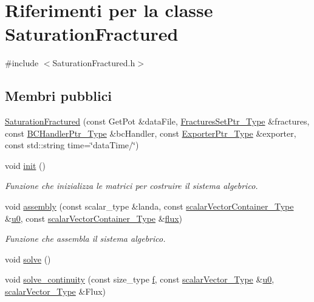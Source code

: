 \hypertarget{classSaturationFractured}{\section{Riferimenti per la classe Saturation\-Fractured}
\label{classSaturationFractured}
}


{\ttfamily \#include $<$Saturation\-Fractured.\-h$>$}

\subsection*{Membri pubblici}
\begin{DoxyCompactItemize}
\item 
\hyperlink{classSaturationFractured_a2d080ad53569f8a8c344d690903b8d11}{Saturation\-Fractured} (const Get\-Pot \&data\-File, \hyperlink{FracturesSet_8h_ac29a2a91d3af77fb459980a7db47f420}{Fractures\-Set\-Ptr\-\_\-\-Type} \&fractures, const \hyperlink{BCHandler_8h_aa175884cb453788647f17f2230a2a762}{B\-C\-Handler\-Ptr\-\_\-\-Type} \&bc\-Handler, const \hyperlink{Exporter_8h_ac9d7f94fea8b91459a536bfaa2f3910c}{Exporter\-Ptr\-\_\-\-Type} \&exporter, const std\-::string time=\char`\"{}data\-Time/\char`\"{})
\item 
void \hyperlink{classSaturationFractured_a6336137dd94d0ff95efc5967f4ab89c4}{init} ()
\begin{DoxyCompactList}\small\item\em Funzione che inizializza le matrici per costruire il sistema algebrico. \end{DoxyCompactList}\item 
void \hyperlink{classSaturationFractured_ad5271c4036ec9a4a7c58cddbb42515ec}{assembly} (const scalar\-\_\-type \&landa, const \hyperlink{Core_8h_ae3afecb4de4310d8262e9ab20cfb875b}{scalar\-Vector\-Container\-\_\-\-Type} \&\hyperlink{init_8m_aada26031cbb47e8d74da9873f5c1e3e1}{u0}, const \hyperlink{Core_8h_ae3afecb4de4310d8262e9ab20cfb875b}{scalar\-Vector\-Container\-\_\-\-Type} \&\hyperlink{quadratica_8m_a96d7a28b6a4428be15fc1017d19343fa}{flux})
\begin{DoxyCompactList}\small\item\em Funzione che assembla il sistema algebrico. \end{DoxyCompactList}\item 
void \hyperlink{classSaturationFractured_a20f1abf94a54768815c78e13a02ed209}{solve} ()
\item 
void \hyperlink{classSaturationFractured_ad7b71f3d032a3b9b52846c9277d706ec}{solve\-\_\-continuity} (const size\-\_\-type \hyperlink{god__e_8m_a8ea372f7ee3c01d11fc4b4d13b8e6a75}{f}, const \hyperlink{Core_8h_a4e75b5863535ba1dd79942de2846eff0}{scalar\-Vector\-\_\-\-Type} \&\hyperlink{init_8m_aada26031cbb47e8d74da9873f5c1e3e1}{u0}, \hyperlink{Core_8h_a4e75b5863535ba1dd79942de2846eff0}{scalar\-Vector\-\_\-\-Type} \&Flux)

\end{DoxyCompactItemize}
